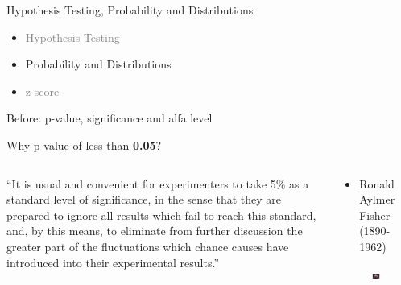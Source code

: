 \documentclass[
  ignorenonframetext,
]{beamer}
\providecommand{\tightlist}{%
  \setlength{\itemsep}{0pt}\setlength{\parskip}{0pt}}
\begin{document}
\begin{frame}{Hypothesis Testing, Probability and Distributions}
\label{hypothesis-testing-probability-and-distributions-1}
\begin{itemize}
\tightlist
\item
  \textcolor{gray}{Hypothesis Testing}
\end{itemize}

\begin{itemize}
\tightlist
\item
  Probability and Distributions
\end{itemize}

\begin{itemize}
\tightlist
\item
  \textcolor{gray}{z-score}
\end{itemize}
\end{frame}

\begin{frame}{Before: p-value, significance and alfa level}
\label{before-p-value-significance-and-alfa-level}
\end{frame}

\begin{frame}{Why p-value of less than \textbf{0.05}?}
\label{why-p-value-of-less-than-0.05}
\begin{columns}[T]
\begin{column}{0.48\textwidth}
``It is usual and convenient for experimenters to take 5\% as a standard
level of significance, in the sense that they are prepared to ignore all
results which fail to reach this standard, and, by this means, to
eliminate from further discussion the greater part of the fluctuations
which chance causes have introduced into their experimental results.''
\end{column}

\begin{column}{0.48\textwidth}
\begin{itemize}
\tightlist
\item
  Ronald Aylmer Fisher (1890-1962)
\end{itemize}

\begin{figure}
\includegraphics[width=0.8\linewidth]{figs/fisher} \end{figure}
\end{column}
\end{columns}
\end{frame}
\end{document}
